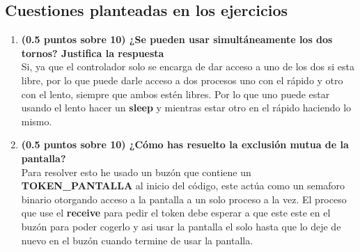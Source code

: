 \documentclass[a4paper,12pt,titlepage,oneside]{article}
\begin{document}
    \subsection{Cuestiones planteadas en los ejercicios}
        \begin{enumerate}[label=\alph*)]
            \item \textbf{(0.5 puntos sobre 10) ¿Se pueden usar simultáneamente los dos tornos? Justifica la
            respuesta}\\
            Si, ya que el controlador solo se encarga de dar acceso a uno de los dos si esta libre,
            por lo que puede darle acceso a dos procesos uno con el rápido y otro con el lento, siempre que ambos 
            estén libres. Por lo que uno puede estar usando el lento hacer un \textbf{sleep} y mientras estar otro
            en el rápido haciendo lo mismo.
            \item \textbf{(0.5 puntos sobre 10) ¿Cómo has resuelto la exclusión mutua de la pantalla?}\\
            Para resolver esto he usado un buzón que contiene un \textbf{TOKEN\_PANTALLA} al inicio del código, 
            este actúa como un semaforo binario otorgando acceso a la pantalla a un solo proceso a la vez. El 
            proceso que use el \textbf{receive} para pedir el token debe esperar a que este este en el buzón para 
            poder cogerlo y asi usar la pantalla el solo hasta que lo deje de nuevo en el buzón cuando termine de usar 
            la pantalla.
        \end{enumerate}
    \newpage
\end{document}
